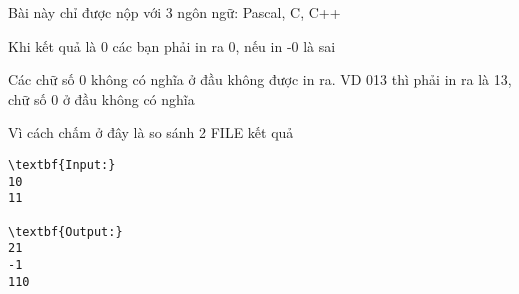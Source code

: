 Bài này chỉ được nộp với 3 ngôn ngữ: Pascal, C, C++  

   Khi kết quả là 0 các bạn phải in ra 0, nếu in -0 là sai  

   Các chữ số 0 không có nghĩa ở đầu không được in ra. VD 013 thì phải in ra là 13, chữ số 0 ở đầu không có nghĩa  

   Vì cách chấm ở đây là so sánh 2 FILE kết quả
\begin{verbatim}
\textbf{Input:}
10
11

\textbf{Output:}
21
-1
110
\end{verbatim}